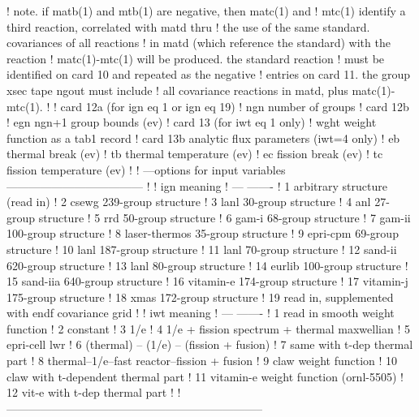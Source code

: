 \begin{ccode}
   !  note.  if matb(1) and mtb(1) are negative, then matc(1) and
   !    mtc(1) identify a third reaction, correlated with matd thru
   !    the use of the same standard.  covariances of all reactions
   !    in matd (which reference the standard) with the reaction
   !    matc(1)-mtc(1) will be produced.  the standard reaction
   !    must be identified on card 10 and repeated as the negative
   !    entries on card 11.  the group xsec tape ngout must include
   !    all covariance reactions in matd, plus matc(1)-mtc(1).
   !
   !  card 12a (for ign eq 1 or ign eq 19)
   !    ngn     number of groups
   !  card 12b
   !    egn     ngn+1 group bounds (ev)
   !  card 13 (for iwt eq 1 only)
   !    wght    weight function as a tab1 record
   !  card 13b  analytic flux parameters (iwt=4 only)
   !    eb      thermal break (ev)
   !    tb      thermal temperature (ev)
   !    ec      fission break (ev)
   !    tc      fission temperature (ev)
   !
   ! ---options for input variables------------------------------------
   !
   !      ign          meaning
   !      ---          -------
   !       1           arbitrary structure (read in)
   !       2           csewg 239-group structure
   !       3           lanl 30-group structure
   !       4           anl 27-group structure
   !       5           rrd 50-group structure
   !       6           gam-i 68-group structure
   !       7           gam-ii 100-group structure
   !       8           laser-thermos 35-group structure
   !       9           epri-cpm 69-group structure
   !      10           lanl 187-group structure
   !      11           lanl 70-group structure
   !      12           sand-ii 620-group structure
   !      13           lanl 80-group structure
   !      14           eurlib 100-group structure
   !      15           sand-iia 640-group structure
   !      16           vitamin-e 174-group structure
   !      17           vitamin-j 175-group structure
   !      18           xmas 172-group structure
   !      19           read in, supplemented with endf covariance grid
   !
   !      iwt          meaning
   !      ---          -------
   !       1           read in smooth weight function
   !       2           constant
   !       3           1/e
   !       4           1/e + fission spectrum + thermal maxwellian
   !       5           epri-cell lwr
   !       6           (thermal) -- (1/e) -- (fission + fusion)
   !       7           same with t-dep thermal part
   !       8           thermal--1/e--fast reactor--fission + fusion
   !       9           claw weight function
   !      10           claw with t-dependent thermal part
   !      11           vitamin-e weight function (ornl-5505)
   !      12           vit-e with t-dep thermal part
   !
   !--------------------------------------------------------------------

\end{ccode}
\normalsize

